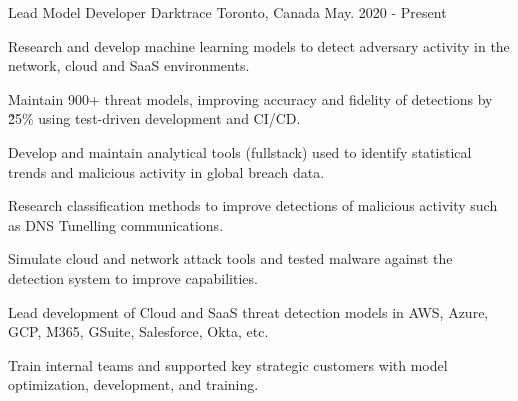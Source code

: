

\begin{cventries}

  \cventry
    {Lead Model Developer} %
    {Darktrace} %
    {Toronto, Canada} %
    {May. 2020 - Present} %
    {
      \begin{cvitems} %
        \item {Research and develop machine learning models to detect adversary activity in the network, cloud and SaaS environments.}
        \item {Maintain 900+ threat models, improving accuracy and fidelity of detections by \~25\% using test-driven development and CI/CD.}
        \item {Develop and maintain analytical tools (fullstack) used to identify statistical trends and malicious activity in global breach data.}
        \item {Research classification methods to improve detections of malicious activity such as DNS Tunelling communications.}
        \item {Simulate cloud and network attack tools and tested malware against the detection system to improve capabilities.}
        \item {Lead development of Cloud and SaaS threat detection models in AWS, Azure, GCP, M365, GSuite, Salesforce, Okta, etc.}
        \item {Train internal teams and supported key strategic customers with model optimization, development, and training.}
      \end{cvitems}
    }


\end{cventries}
